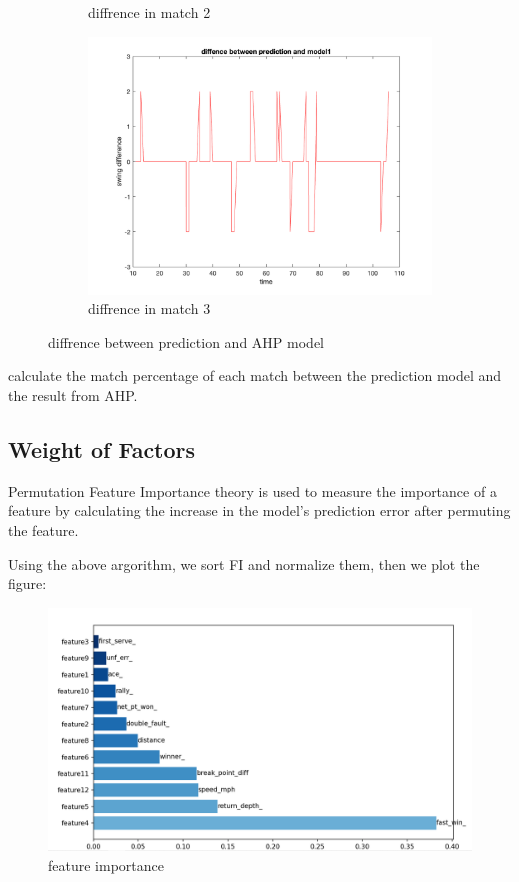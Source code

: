 \begin{figure}[H]
\begin{subfigure}[b]{0.34\textwidth}
        \caption{diffrence in match 2}
    \end{subfigure}\hspace{-0.02\textwidth}
    \begin{subfigure}[b]{0.34\textwidth}
        \includegraphics[width=\linewidth]{mainmatter/imgs/swing_diff_match3_overfit.png}
        \caption{diffrence in match 3}
    \end{subfigure}
    \caption{diffrence between prediction and AHP model}
    \label{fig:diff swing}
\end{figure}

calculate the match percentage of each match between the prediction model and the result from AHP.

\subsection{Weight of Factors}

Permutation Feature Importance theory is used to measure the importance of a feature by calculating 
the increase in the model's prediction error after permuting the feature.

Using the above argorithm, we sort FI and normalize them, then we plot the figure:

\begin{figure}[H]
    \centering
    \includegraphics[scale=0.6]{mainmatter/imgs/8.png}
    \caption{feature importance}
\end{figure}

